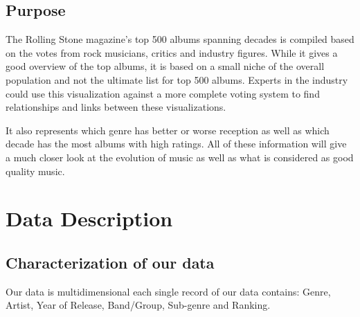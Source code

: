 \documentclass{article}
\begin{document}
\subsection{Purpose}

The Rolling Stone magazine's top 500 albums spanning decades is compiled based on the votes from rock musicians, critics and industry figures. While it gives a good overview of the top albums, it is based on a small niche of the overall population and not the ultimate list for top 500 albums. Experts in the industry could use this visualization against a more complete voting system to find relationships and links between these visualizations.

It also represents which genre has better or worse reception as well as which decade has the most albums with high ratings. All of these information will give a much closer look at the evolution of music as well as what is considered as good quality music.


\section{Data Description}
\subsection{Characterization of our data}

Our data is multidimensional each single record of our data contains: Genre, Artist, Year of Release, Band/Group, Sub-genre and Ranking.
\end{document}
